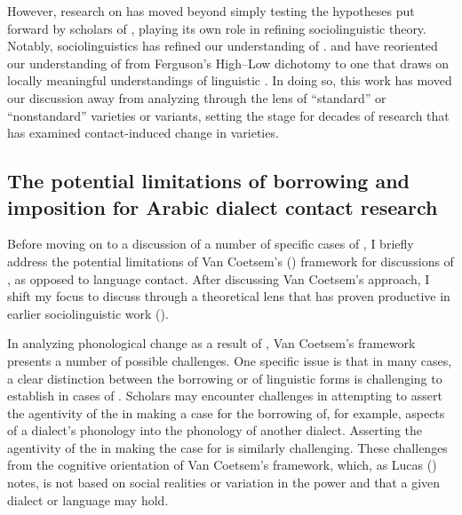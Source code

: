 \documentclass[output=paper]{langsci/langscibook}
\begin{document}
  However, research on  has moved beyond simply testing the hypotheses put forward by scholars of  , playing its own role in refining sociolinguistic theory. Notably,  sociolinguistics has refined our understanding of  \citep{Ferguson1959}. \citet{Ibrahim1986} and \citet{Haeri2000} have reoriented our understanding of   from Ferguson’s High–Low dichotomy to one that draws on locally meaningful understandings of linguistic . In doing so, this work has moved our discussion away from analyzing  through the lens of “standard” or “nonstandard” varieties or variants, setting the stage for decades of research that has examined contact-induced change in  varieties.


 
 \subsection{The potential limitations of borrowing and imposition for Arabic dialect contact research}


Before moving on to a discussion of a number of specific cases of  , I briefly address the potential limitations of Van Coetsem’s (\citeyear{VanCoetsem1988,VanCoetsem2000}) framework for discussions of , as opposed to language contact. After discussing Van Coetsem’s approach, I shift my focus to discuss   through a theoretical lens that has proven productive in earlier sociolinguistic work (\citealt{Trudgill1986,Trudgill2004}). 

  In analyzing phonological change as a result of , Van Coetsem’s framework presents a number of possible challenges. One specific issue is that in many cases, a clear distinction between the borrowing or  of linguistic forms is challenging to establish in cases of  . Scholars may encounter challenges in attempting to assert the agentivity of the  in making a case for the borrowing of, for example, aspects of a dialect’s phonology into the phonology of another dialect. Asserting the agentivity of the  in making the case for  is similarly challenging. These challenges  from the cognitive orientation of Van Coetsem’s framework, which, as Lucas (\citeyear[521]{Lucas2015}) notes, is not based on social realities or variation in the power and  that a given dialect or language may hold. 
\end{document}
